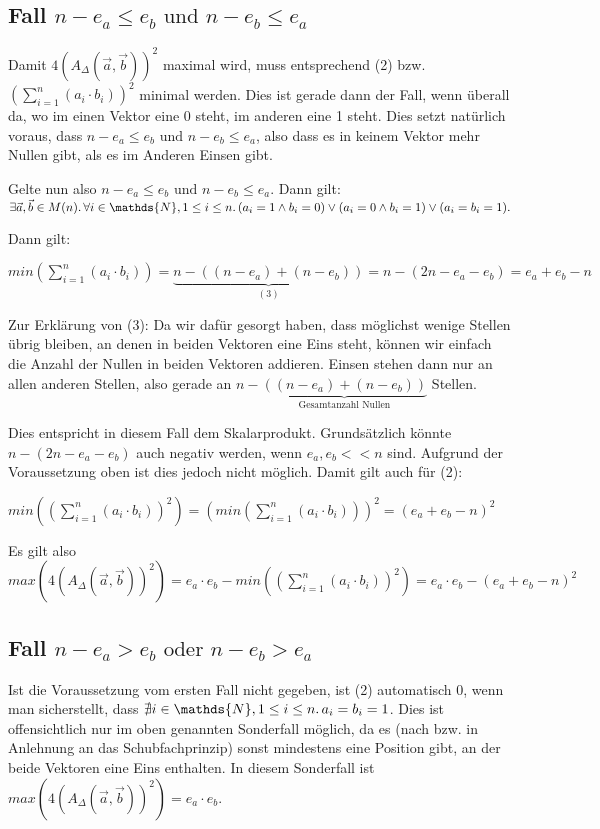 \documentclass{article}
\newcommand{\sumN}[2]{\ensuremath{\sum\limits_{#1}^{#2}}}
\newcommand{\inN}[1]{\ensuremath{#1 \in \mathds{N}}}
\newcommand{\faExp}[2]{\ensuremath{\forall #1 \ldotp #2}}
\begin{document}
\subsection{Fall $n-e_a \leq e_b \text{ und } n-e_b \leq e_a$}

Damit $4(A_\Delta(\vec a,\vec b))^2$ maximal wird, muss entsprechend (2) bzw. $(\sumN{i=1}{n}(a_i \cdot b_i))^2$ minimal werden. Dies ist gerade dann der Fall, wenn überall da, wo im einen Vektor eine 0 steht, im anderen eine 1 steht. Dies setzt natürlich voraus, dass $n-e_a \leq e_b \text{ und } n-e_b \leq e_a$, also dass es in keinem Vektor mehr Nullen gibt, als es im Anderen Einsen gibt. 

Gelte nun also $n-e_a \leq e_b \text{ und } n-e_b \leq e_a$. Dann gilt: $\exists \vec a, \vec b \in M(n) \ldotp \faExp{\inN{i}, 1 \leq i \leq n}{(a_i = 1 \land b_i = 0) \lor (a_i = 0 \land b_i = 1) \lor (a_i = b_i = 1) \ldotp}$

Dann gilt:

$min(\sumN{i=1}{n}(a_i \cdot b_i)) = \underbrace{n - ((n-e_a)+(n-e_b))}_{(3)} = n - (2n-e_a-e_b) = e_a + e_b - n$

Zur Erklärung von (3): Da wir dafür gesorgt haben, dass möglichst wenige Stellen übrig bleiben, an denen in beiden Vektoren eine Eins steht, können wir einfach die Anzahl der Nullen in beiden Vektoren addieren. Einsen stehen dann nur an allen anderen Stellen, also gerade an $n - \underbrace{ ((n-e_a)+(n-e_b))}_{\text{Gesamtanzahl Nullen}}$ Stellen. 

Dies entspricht in diesem Fall dem Skalarprodukt. Grundsätzlich könnte $n - (2n-e_a-e_b)$ auch negativ werden, wenn $e_a, e_b << n$ sind. Aufgrund der Voraussetzung oben ist dies jedoch nicht möglich. Damit gilt auch für (2):

$min((\sumN{i=1}{n}(a_i \cdot b_i))^2) = (min(\sumN{i=1}{n}(a_i \cdot b_i)))^2 = (e_a + e_b - n)^2$

Es gilt also $max(4(A_\Delta(\vec a,\vec b))^2) = e_a \cdot e_b - min((\sumN{i=1}{n}(a_i \cdot b_i))^2) = e_a \cdot e_b - (e_a + e_b - n)^2$

\subsection{Fall $n-e_a > e_b \text{ oder } n-e_b > e_a$}

Ist die Voraussetzung vom ersten Fall nicht gegeben, ist (2) automatisch 0, wenn man sicherstellt, dass $\nexists \inN{i}, 1 \leq i \leq n \ldotp a_i = b_i = 1$. Dies ist offensichtlich nur im oben genannten Sonderfall möglich, da es (nach bzw. in Anlehnung an das Schubfachprinzip) sonst mindestens eine Position gibt, an der beide Vektoren eine Eins enthalten. In diesem Sonderfall ist $max(4(A_\Delta(\vec a,\vec b))^2) = e_a \cdot e_b$.
\end{document}
